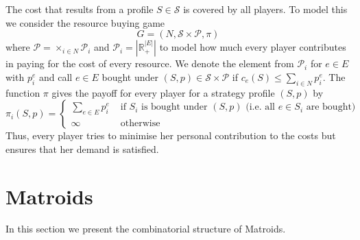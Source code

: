 \documentclass{scrartcl}
\theoremstyle{nonumberplain}
\newcommand{\tupel}[1]{\left(#1\right)}
\begin{document}
The cost that results from a profile $S\in\mathcal{S}$ is covered by all
players. To model this we consider the resource buying game 
\begin{equation*}
  G = \tupel{N, \mathcal{S}\times\mathcal{P}, \pi}
\end{equation*}
where $\mathcal{P} = \times_{i\in N}\mathcal{P}_{i}$ and
$\mathcal{P}_{i} = |\mathbb{R}_{+}^{|E|}|$ to model how much every player
contributes in paying for the cost of every resource. We denote the element
from $\mathcal{P}_{i}$ for $e\in E$ with $p_{i}^{e}$ and call $e\in E$ bought
under $\tupel{S, p}\in \mathcal{S}\times\mathcal{P}$ if
$c_{e}(S)\leq \sum_{i\in N}p_{i}^{e}$. The function $\pi$ gives the payoff for
every player for a strategy profile $\tupel{S, p}$ by
\begin{equation*}
  \pi_{i}(S, p) = \begin{cases}
    \sum_{e\in E}p_{i}^{e} &\text{ if $S_{i}$ is bought under
    $\tupel{S, p}$ (i.e. all $e\in S_{i}$ are bought)}\\
    \infty &\text{ otherwise}
  \end{cases}
\end{equation*}
Thus, every player tries to minimise her personal contribution to the costs
but ensures that her demand is satisfied.
\section{Matroids}
In this section we present the combinatorial structure of Matroids.
\end{document}
